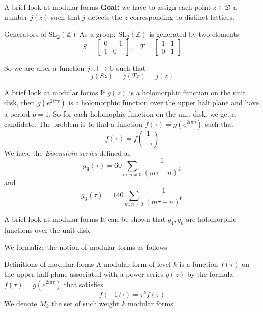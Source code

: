 \documentclass[pdf]{beamer}
\begin{document}
\begin{frame}{A brief look at modular forms}
    \textbf{Goal:} we have to assign each point $z \in \mathfrak{D}$ a number $j(z)$ such that $j$ detects the $z$ corresponding to distinct lattices. \pause
    \begin{block}{Generators of $\text{SL}_2(\mathbb{Z})$}
        As a group,  $\text{SL}_2(\mathbb{Z})$ is generated by two elements
        \[S = \begin{bmatrix} 0 & -1 \\ 1 & 0 \end{bmatrix}, \quad T=\begin{bmatrix} 1 & 1 \\ 0 & 1 \end{bmatrix}\]
    \end{block}\pause
    So we are after a function $j \colon \mathbb{H} \to \mathbb{C}$ such that
    \[j(Sz)  = j(Tz) = j(z)\]
\end{frame}
\begin{frame}{A brief look at modular forms}
    If $g(z)$ is a holomorphic function on the unit disk, then $g(e^{2i\pi\tau})$ is a holomorphic function over the upper half plane and have a period $p=1$. So for each holomophic function on the unit disk, we get a candidate. The problem is to find a function $f(\tau)= g(e^{2i\pi\eta})$ such that
    \[f(\tau) = f\left(\dfrac{1}{-\tau}\right)\]
    We have the \textit{Eisenstein series} defined as
    \[g_4(\tau) = 60\sum_{m,n \ne 0} \dfrac{1}{(m\tau+n)^4}\]
    and
    \[g_6(\tau) = 140\sum_{m,n \ne 0} \dfrac{1}{(m\tau+n)^6}\]
\end{frame}
\begin{frame}{A brief look at modular forms}
    It can be shown that $g_4,g_6$ are holomorphic functions over the unit disk.

    We formalize the notion of modular forms as follows
    \begin{block}{Definitions of modular forms}
        A modular form of level $k$ is a function $f(\tau)$ on the upper half plane associated with a power series $g(z)$ by the formula $f(\tau) = g(e^{2i\pi\tau})$ that satisfies
        \[f(-1/\tau)= \tau^k f\left(\tau\right)\]
        We denote $M_k$ the set of such weight $k$ modular forms.
    \end{block}
\end{frame}
\end{document}
